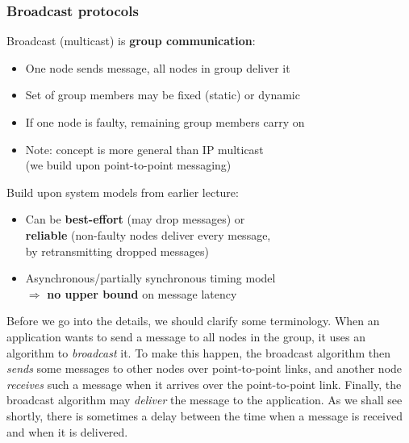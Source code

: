 \begin{frame}
    \label{s:broadcast-intro}
    \frametitle{Broadcast protocols}
    Broadcast (multicast) is \textbf{group communication}:
    \begin{itemize}
        \item One node sends message, all nodes in group deliver it\pause
        \item Set of group members may be fixed (static) or dynamic\pause
        \item If one node is faulty, remaining group members carry on\pause
        \item Note: concept is more general than IP multicast\\
            (we build upon point-to-point messaging)\\[1em]\pause
    \end{itemize}
    Build upon system models from earlier lecture:
    \begin{itemize}
        \item Can be \textbf{best-effort} (may drop messages) or \\
            \textbf{reliable} (non-faulty nodes deliver every message,\\
            by retransmitting dropped messages)\pause
        \item Asynchronous/partially synchronous timing model\\
            $\Longrightarrow$ \textbf{no upper bound} on message latency
    \end{itemize}
\end{frame}
\label{l:broadcast-intro}

Before we go into the details, we should clarify some terminology.
When an application wants to send a message to all nodes in the group, it uses an algorithm to \emph{broadcast} it.
To make this happen, the broadcast algorithm then \emph{sends} some messages to other nodes over point-to-point links, and another node \emph{receives} such a message when it arrives over the point-to-point link.
Finally, the broadcast algorithm may \emph{deliver} the message to the application.
As we shall see shortly, there is sometimes a delay between the time when a message is received and when it is delivered.

